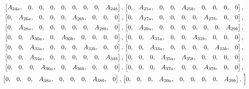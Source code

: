 \begin{multline}
 \begin{bmatrix} A_{24a}, & 0, & 0, & 0, & 0, & 0, & 0, & 0, & A_{24b}  \end{bmatrix},\, %
 \begin{bmatrix} 0, &  A_{25a}, & 0, & 0, & A_{25b}, & 0, & 0, & 0, & 0  \end{bmatrix},\, \\%
 \begin{bmatrix} 0, &  A_{26a}, & 0, & 0, & 0, & A_{26b}, & 0, & 0, & 0  \end{bmatrix},\,  %
 \begin{bmatrix} 0, &  A_{27a}, & 0, & 0, & 0, & 0, & A_{27b}, & 0, & 0  \end{bmatrix},\, \\%
 \begin{bmatrix} 0, &  A_{28a}, & 0, & 0, & 0, & 0, & 0, & A_{28b}, & 0  \end{bmatrix},\,  %
 \begin{bmatrix} 0, &  A_{29a}, & 0, & 0, & 0, & 0, & 0, & 0, & A_{29b}  \end{bmatrix},\, \\%
 \begin{bmatrix} 0, &  0, &  A_{30a}, & 0, & A_{30b}, & 0, & 0, & 0, & 0  \end{bmatrix},\, %
 \begin{bmatrix} 0, &  0, &  A_{31a}, & 0, & 0, & A_{31b}, & 0, & 0, & 0  \end{bmatrix},\, \\  %
 \begin{bmatrix} 0, &  0, &  A_{32a}, & 0, & 0, & 0, & A_{32b}, & 0, & 0  \end{bmatrix},\, %
 \begin{bmatrix} 0, &  0, &  A_{33a}, & 0, & 0, & 0, & 0, & A_{33b}, & 0  \end{bmatrix},\, \\ %
 \begin{bmatrix} 0, &  0, &  A_{34a}, & 0, & 0, & 0, & 0, & 0, & A_{34b}  \end{bmatrix},\, %
 \begin{bmatrix} 0, &  0, & 0, &  A_{35a}, & A_{35b}, & 0, & 0, & 0, & 0  \end{bmatrix},\, \\%
 \begin{bmatrix} 0, &  0, &  0, &  A_{36a}, & 0, & A_{36b}, & 0, & 0, & 0  \end{bmatrix},\,  %
 \begin{bmatrix} 0, &  0, &  0, &  A_{37a}, & 0, & 0, & A_{37b}, & 0, & 0  \end{bmatrix},\, \\%
 \begin{bmatrix} 0, &  0, &  0, &  A_{38a}, & 0, & 0, & 0, & A_{38b}, & 0  \end{bmatrix},\,  %
 \begin{bmatrix} 0, &  0, &  0, &  A_{39a}, & 0, & 0, & 0, & 0, & A_{39b}  \end{bmatrix},\, %
\Bigl] 
\end{multline}
